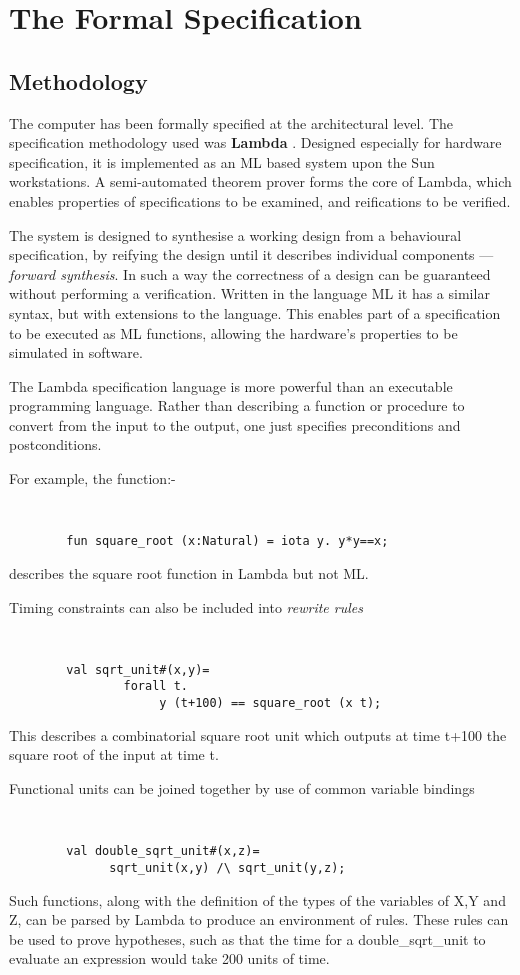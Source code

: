 \chapter{The Formal Specification}


\section{Methodology}
The computer has been formally specified at the architectural level.
 The specification methodology used was {\bf Lambda} \cite{ahl:lambda}.
Designed especially 
 for hardware specification, it is implemented as an ML 
based system upon the Sun workstations. 
A semi-automated theorem prover  forms the 
core of Lambda, which enables properties of specifications to be 
examined, and reifications to be verified.

The system is designed to synthesise a working design from a 
behavioural specification, by reifying the design until it 
describes individual components ---{\em forward synthesis}.
 In such a way the correctness of a design 
can be guaranteed without performing a verification. 
Written in the language ML it has a similar syntax, but with extensions to the language.
This enables part of a specification to be executed as  ML functions,
allowing the hardware's  properties to be simulated in software.

The  Lambda specification language is more powerful than an 
executable programming language. Rather than describing a function 
or procedure to convert from the input to the output, one just specifies  preconditions and
postconditions. 

{\samepage
For example, the function:-
{\tt
\begin{verbatim}
        fun square_root (x:Natural) = iota y. y*y==x;
\end{verbatim}
}

describes the square root function in Lambda but not ML.
}
Timing constraints can also be included into {\em rewrite rules}
{\tt
\begin{verbatim}
        val sqrt_unit#(x,y)=
                forall t.
                     y (t+100) == square_root (x t);
\end{verbatim}			
}
This describes a combinatorial square root unit which outputs at time
t+100 the square root of the input at time t.

Functional units can  be joined together by use of common variable bindings
{\tt
\begin{verbatim}
        val double_sqrt_unit#(x,z)=
              sqrt_unit(x,y) /\ sqrt_unit(y,z);		
\end{verbatim}
}
Such functions, along with the definition of the types of the variables of X,Y and Z, can be parsed by  Lambda to produce an environment of rules.
These rules can be used to prove hypotheses, such as that the time for a double\_sqrt\_unit to evaluate an expression would take 200 units of time.


